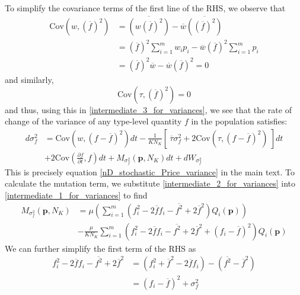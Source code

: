 To simplify the covariance terms of the first line of the RHS, we observe that
\begin{align*}
\textrm{Cov}\left(w, {\left(\overline{f}\right)}^2\right) &= \overline{\left(w{\left(\overline{f}\right)}^2\right)} - \overline{w}\overline{\left({\left(\overline{f}\right)}^2\right)}\\
&= {\left(\overline{f}\right)}^2\sum\limits_{i=1}^{m}w_ip_i - \overline{w}{\left(\overline{f}\right)}^2\sum\limits_{i=1}^{m}p_i\\
&= {\left(\overline{f}\right)}^2\overline{w} - \overline{w}{\left(\overline{f}\right)}^2 = 0
\end{align*}
and similarly,
\begin{equation*}
\textrm{Cov}\left(\tau, {\left(\overline{f}\right)}^2\right) = 0
\end{equation*}
and thus, using this in \eqref{intermediate_3_for_variances},  we see that the rate of change of the variance of any type-level quantity $f$ in the population satisfies:
\begin{equation}
\label{app_nD_stochastic_Price_variance}
\begin{aligned}
d\sigma^2_{f} &= \textrm{Cov}\left(w,(f - \overline{f})^2\right)dt - \frac{1}{KN_K}\left[ \ \overline{\tau}\sigma^2_{f} +  2\textrm{Cov}\left(\tau,(f - \overline{f})^2\right) \ \right]dt\\[12pt]
& + 2\textrm{Cov}\left(\frac{\partial f}{\partial t},f\right)dt + M_{\sigma^2_f}(\mathbf{p},N_K)dt + dW_{\sigma^2_{f}}
\end{aligned}
\end{equation}
This is precisely equation \eqref{nD_stochastic_Price_variance} in the main text. To calculate the mutation term, we substitute \eqref{intermediate_2_for_variances} into \eqref{intermediate_1_for_variances} to find
\begin{equation}
\begin{aligned}
M_{\sigma^2_f}(\mathbf{p},N_K) &= \mu\left(\sum\limits_{i=1}^{m}\left(f^2_i - 2\overline{f}f_i -\overline{f^2}+2\overline{f}^2\right)Q_i(\mathbf{p})\right)\\
&- \frac{\mu}{KN_K}\sum\limits_{i=1}^{m}\left(f^2_i - 2\overline{f}f_i -\overline{f^2}+2\overline{f}^2 + (f_i - \overline{f})^2\right)Q_i(\mathbf{p}) 
\end{aligned}
\end{equation}
We can further simplify the first term of the RHS as
\begin{align*}
f^2_i - 2\overline{f}f_i -\overline{f^2}+2\overline{f}^2 &= (f^2_i +\overline{f}^2 - 2\overline{f}f_i) - (\overline{f^2} - \overline{f}^2)\\
&= (f_i - \overline{f})^2 + \sigma^2_f
\end{align*}
